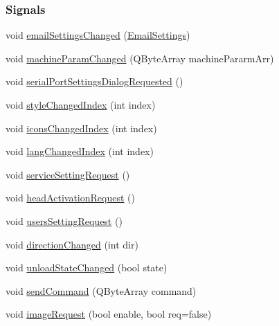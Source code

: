 \subsubsection*{Signals}
\begin{DoxyCompactItemize}
\item 
void \mbox{\hyperlink{classGeneralSettingDialog_a825854c03817dfdb5b7c6185008ab620}{email\+Settings\+Changed}} (\mbox{\hyperlink{structEmailSettings}{Email\+Settings}})
\item 
void \mbox{\hyperlink{classGeneralSettingDialog_a02019fb6d81fc0e83ed6ae0ef7ef68b4}{machine\+Param\+Changed}} (Q\+Byte\+Array machine\+Pararm\+Arr)
\item 
void \mbox{\hyperlink{classGeneralSettingDialog_aef493e3f166d3bd7cb982f854f29617e}{serial\+Port\+Settings\+Dialog\+Requested}} ()
\item 
void \mbox{\hyperlink{classGeneralSettingDialog_ab651d47f726e1049c0bf34e6ebcb8cf1}{style\+Changed\+Index}} (int index)
\item 
void \mbox{\hyperlink{classGeneralSettingDialog_aa0b2ee80957f63f302aa9a6ac6e13f5d}{icons\+Changed\+Index}} (int index)
\item 
void \mbox{\hyperlink{classGeneralSettingDialog_ac3d2f3477274bedf08848cc24eaece06}{lang\+Changed\+Index}} (int index)
\item 
void \mbox{\hyperlink{classGeneralSettingDialog_a8ac7f5a379cd6ec270bc98050e4c7765}{service\+Setting\+Request}} ()
\item 
void \mbox{\hyperlink{classGeneralSettingDialog_a386763acc4545a1c03542ef71601c23c}{head\+Activation\+Request}} ()
\item 
void \mbox{\hyperlink{classGeneralSettingDialog_a9bc417a43ff037b30e281e38fbc98744}{users\+Setting\+Request}} ()
\item 
void \mbox{\hyperlink{classGeneralSettingDialog_aa4bc1d43246c829906a530b5a127a417}{direction\+Changed}} (int dir)
\item 
void \mbox{\hyperlink{classGeneralSettingDialog_a3ec05b9d5bf741008ba575d408af6c04}{unload\+State\+Changed}} (bool state)
\item 
void \mbox{\hyperlink{classGeneralSettingDialog_aa381596bc44cfcaeb85a8d906b877b86}{send\+Command}} (Q\+Byte\+Array command)
\item 
void \mbox{\hyperlink{classGeneralSettingDialog_a1c6ff8e8d7b1ad5f4399942ea48dc9d8}{image\+Request}} (bool enable, bool req=false)
\end{DoxyCompactItemize}
